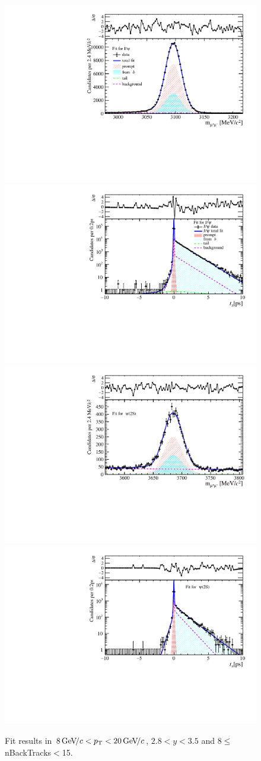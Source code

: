 \begin{figure}[H]
\begin{center}
\includegraphics[width=0.47\linewidth]{pdf/Jpsi/drawmassB/n2y2pt5.pdf}
\includegraphics[width=0.47\linewidth]{pdf/Jpsi/2DFitB/n2y2pt5.pdf}
\vspace*{-0.5cm}
\includegraphics[width=0.47\linewidth]{pdf/Psi2S/drawmassB/n2y2pt5.pdf}
\includegraphics[width=0.47\linewidth]{pdf/Psi2S/2DFitB/n2y2pt5.pdf}
\vspace*{-0.5cm}
\end{center}
\caption{Fit results in $8\text{\,Ge\kern -0.1em V\!/}c<p_{\mathrm{T}}<20\text{\,Ge\kern -0.1em V\!/}c$, $2.8<y<3.5$ and 8$\leq$nBackTracks$<$15.}
\label{Fitn2y2pt5}
\end{figure}
